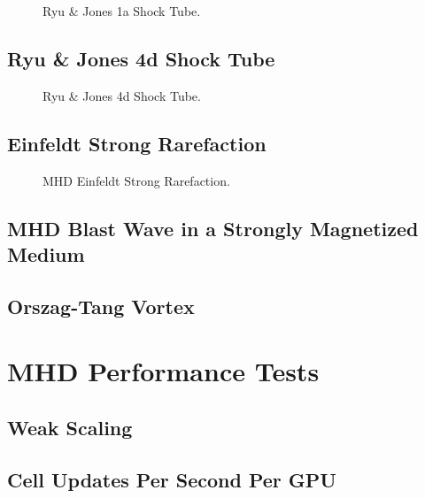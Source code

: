 \begin{figure}[ht!]
    \caption{Ryu \& Jones 1a Shock Tube. 
    }
    \label{fig:rj-1a}
\end{figure}

\subsection{Ryu \& Jones 4d Shock Tube}

\begin{figure}[ht!]
    \caption{Ryu \& Jones 4d Shock Tube. 
    }
    \label{fig:rj-4d}
\end{figure}

\subsection{Einfeldt Strong Rarefaction}

\begin{figure}[ht!]
    \caption{MHD Einfeldt Strong Rarefaction.
    }
    \label{fig:einfeldt}
\end{figure}

\subsection{MHD Blast Wave in a Strongly Magnetized Medium}
\subsection{Orszag-Tang Vortex}


\section{MHD Performance Tests}
\label{sec:mhd-perf-tests}


\subsection{Weak Scaling}

\subsection{Cell Updates Per Second Per GPU}

